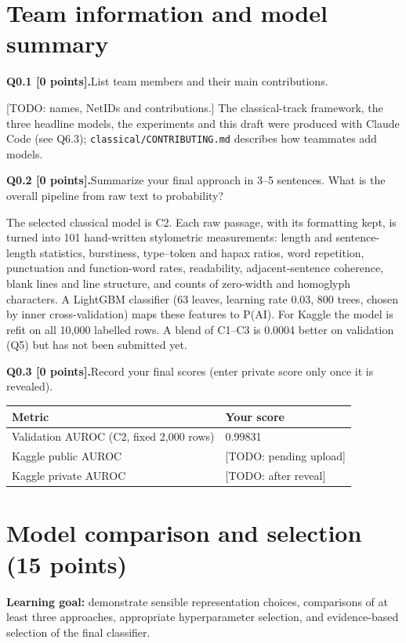 \documentclass[11pt,letterpaper]{article}
\newcommand{\question}[2]{\needspace{4\baselineskip}\par\addvspace{0.45em}\noindent\textbf{#1}\quad #2\par\nobreak\vspace{0.1em}}
\begin{document}
\section{Team information and model summary}
\question{Q0.1 [0 points].}{List team members and their main contributions.}
{\raggedright [TODO: names, NetIDs and contributions.] The classical-track framework, the three headline models, the experiments and this draft were produced with Claude Code (see Q6.3); \texttt{classical/CONTRIBUTING.md} describes how teammates add models.\par}

\question{Q0.2 [0 points].}{Summarize your final approach in 3--5 sentences. What is the overall pipeline from raw text to probability?}
The selected classical model is C2. Each raw passage, with its formatting kept, is turned into 101 hand-written stylometric measurements: length and sentence-length statistics, burstiness, type--token and hapax ratios, word repetition, punctuation and function-word rates, readability, adjacent-sentence coherence, blank lines and line structure, and counts of zero-width and homoglyph characters. A LightGBM classifier (63 leaves, learning rate 0.03, 800 trees, chosen by inner cross-validation) maps these features to P(AI). For Kaggle the model is refit on all 10,000 labelled rows. A blend of C1--C3 is 0.0004 better on validation (Q5) but has not been submitted yet.

\question{Q0.3 [0 points].}{Record your final scores (enter private score only once it is revealed).}
\begin{tabularx}{\linewidth}{@{}Yp{1.8in}@{}}\toprule Metric & Your score \\ \midrule Validation AUROC (C2, fixed 2,000 rows) & 0.99831 \\ Kaggle public AUROC & [TODO: pending upload] \\ Kaggle private AUROC & [TODO: after reveal] \\ \bottomrule\end{tabularx}

\newpage
\section{Model comparison and selection (15 points)}
\textbf{Learning goal:} demonstrate sensible representation choices, comparisons of at least three approaches, appropriate hyperparameter selection, and evidence-based selection of the final classifier.
\end{document}
